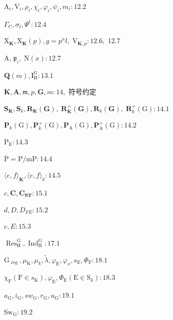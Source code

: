 \documentclass[10pt]{article}
\begin{document}
\({\mathrm{A}}_{i},{\mathrm{V}}_{i},{\rho }_{i},{\chi }_{i},{\varphi }_{i},{\psi }_{i},{m}_{i} : {12.2}\)

\({\Gamma }_{\mathrm{C}},{\sigma }_{t},{\Psi }^{t} : {12.4}\)

\({\mathrm{X}}_{\mathbf{K}},{\mathrm{X}}_{\mathbf{K}}\left( p\right) ,g = {p}^{n}l,{\mathrm{\;V}}_{\mathbf{K},p} : {12.6},\) 12.7

A, \({\mathfrak{p}}_{i},\mathrm{\;N}\left( x\right)  : {12.7}\)

\(\mathbf{Q}\left( m\right) ,{\mathbf{l}}_{\mathrm{H}}^{\mathrm{G}} : {13.1}\)

\(\mathbf{K},\mathbf{A},\mathfrak{m},p,\mathbf{G},m : {14},\) 符号约定

\({\mathbf{S}}_{\mathbf{K}},{\mathbf{S}}_{k},{\mathbf{R}}_{\mathbf{K}}\left( \mathbf{G}\right) ,\;{\mathbf{R}}_{\mathbf{K}}^{ + }\left( \mathbf{G}\right) ,{\mathbf{R}}_{k}\left( \mathbf{G}\right) , \; {\mathbf{R}}_{k}^{ + }\left( \mathrm{G}\right)  : {14.1}\)

\({\mathbf{P}}_{k}\left( \mathrm{G}\right) ,{\mathbf{P}}_{k}^{ + }\left( \mathrm{G}\right) ,{\mathbf{P}}_{\mathrm{A}}\left( \mathrm{G}\right) ,{\mathbf{P}}_{\mathrm{A}}^{ + }\left( \mathrm{G}\right)  : {14.2}\)

\({\mathrm{P}}_{\mathrm{E}} : {14.3}\)

\(\overline{\mathrm{P}} = \mathrm{P}/\mathrm{{mP}} : {14.4}\)

\(\langle e,f{\rangle }_{\mathbf{K}},\langle e,f{\rangle }_{k} : {14.5}\)

\(c,\mathbf{C},{\mathbf{C}}_{\mathbf{{ST}}} : {15.1}\)

\(d,D,{D}_{FE} : {15.2}\)

\(e,E : {15.3}\)

\({\operatorname{Res}}_{\mathrm{H}}^{\mathrm{G}},{\operatorname{Ind}}_{\mathrm{H}}^{\mathrm{G}} : {17.1}\)

\({\mathrm{G}}_{\text{ reg }},{\mu }_{\mathrm{K}},{\mu }_{k},\widetilde{\lambda },{\varphi }_{\mathrm{E}},{\varphi }_{x},{s}_{\mathrm{E}},{\Phi }_{\mathrm{F}} : {18.1}\)

\({\chi }_{\mathrm{F}}\left( {\mathrm{F} \in  {s}_{\mathrm{K}}}\right) ,{\varphi }_{\mathrm{E}},{\Phi }_{\mathrm{E}}\left( {\mathrm{E} \in  {\mathrm{S}}_{k}}\right)  : {18.3}\)

\({a}_{\mathrm{G}},{i}_{\mathrm{G}},s{w}_{\mathrm{G}},{r}_{\mathrm{G}},{u}_{\mathrm{G}} : {19.1}\)

\({\mathrm{{Sw}}}_{\mathrm{G}} : {19.2}\)
\end{document}
